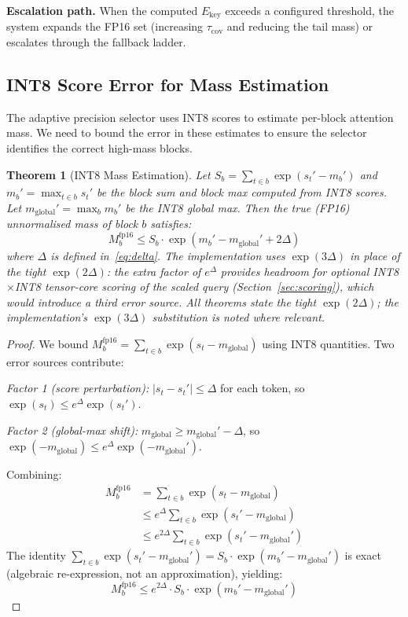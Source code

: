 \documentclass[10pt,twocolumn,a4paper]{article}
\newtheorem{theorem}{Theorem}[section]
\theoremstyle{definition}
\theoremstyle{remark}
\begin{document}
\textbf{Escalation path.}  When the computed $E_{\mathrm{key}}$ exceeds a configured threshold, the system expands the FP16 set (increasing $\tau_{\mathrm{cov}}$ and reducing the tail mass) or escalates through the fallback ladder.

\subsection{INT8 Score Error for Mass Estimation}
\label{sec:score_error}

The adaptive precision selector uses INT8 scores to estimate per-block attention mass.  We need to bound the error in these estimates to ensure the selector identifies the correct high-mass blocks.

\begin{theorem}[INT8 Mass Estimation]
\label{thm:mass}
Let $S_b = \sum_{t \in b} \exp(s_t' - m_b')$ and $m_b' = \max_{t \in b} s_t'$ be the block sum and block max computed from INT8 scores.  Let $m_{\mathrm{global}}' = \max_b m_b'$ be the INT8 global max.  Then the true (FP16) unnormalised mass of block $b$ satisfies:
\begin{equation}
\label{eq:mass_bound}
  M_b^{\mathrm{fp16}} \leq S_b \cdot \exp(m_b' - m_{\mathrm{global}}' + 2\Delta)
\end{equation}
where $\Delta$ is defined in~\eqref{eq:delta}.  The implementation uses $\exp(3\Delta)$ in place of the tight $\exp(2\Delta)$: the extra factor of $e^{\Delta}$ provides headroom for optional INT8$\times$INT8 tensor-core scoring of the scaled query (Section~\ref{sec:scoring}), which would introduce a third error source.  All theorems state the tight $\exp(2\Delta)$; the implementation's $\exp(3\Delta)$ substitution is noted where relevant.
\end{theorem}

\begin{proof}
We bound $M_b^{\mathrm{fp16}} = \sum_{t \in b} \exp(s_t - m_{\mathrm{global}})$ using INT8 quantities.  Two error sources contribute:

\emph{Factor 1 (score perturbation):}  $|s_t - s_t'| \leq \Delta$ for each token, so $\exp(s_t) \leq e^{\Delta} \exp(s_t')$.

\emph{Factor 2 (global-max shift):}  $m_{\mathrm{global}} \geq m_{\mathrm{global}}' - \Delta$, so $\exp(-m_{\mathrm{global}}) \leq e^{\Delta} \exp(-m_{\mathrm{global}}')$.

Combining:
\begin{align*}
  M_b^{\mathrm{fp16}} &= \sum_{t \in b}\exp(s_t - m_{\mathrm{global}}) \\
  &\leq e^{\Delta} \sum_{t \in b}\exp(s_t' - m_{\mathrm{global}}) \\
  &\leq e^{2\Delta} \sum_{t \in b}\exp(s_t' - m_{\mathrm{global}}')
\end{align*}
The identity $\sum_{t \in b}\exp(s_t' - m_{\mathrm{global}}') = S_b \cdot \exp(m_b' - m_{\mathrm{global}}')$ is exact (algebraic re-expression, not an approximation), yielding:
\[
  M_b^{\mathrm{fp16}} \leq e^{2\Delta} \cdot S_b \cdot \exp(m_b' - m_{\mathrm{global}}')
\]
\end{proof}
\end{document}

